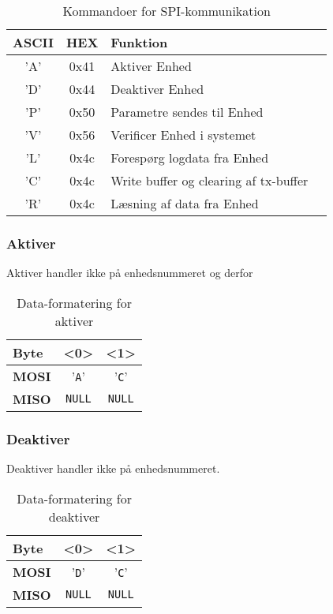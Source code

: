 \begin{table}[H]
\caption{Kommandoer for SPI-kommunikation}
\centering
\begin{tabular}{|c|c|l|c|}
\hline 
\textbf{ASCII} & \textbf{HEX} & \textbf{Funktion} \\ 
\hline 
'A' & 0x41 & Aktiver Enhed \\ 
\hline 
'D' & 0x44 & Deaktiver Enhed \\ 
\hline 
'P' & 0x50 & Parametre sendes til Enhed \\
\hline 
'V' & 0x56 & Verificer Enhed i systemet \\ 
\hline
'L' & 0x4c & Forespørg logdata fra Enhed \\ 
\hline
'C' & 0x4c & Write buffer og clearing af tx-buffer  \\
\hline
'R' & 0x4c & Læsning af data fra Enhed \\
\hline
\end{tabular}
\label{tabel:SWProtokol-kommandoer}
\end{table} 


\subsubsection{Aktiver}

Aktiver handler ikke på enhedsnummeret og derfor 

\begin{table}[H]
	\caption{Data-formatering for aktiver}
	\centering
	\begin{tabular}{|l|c|c|}
		\hline 
		\textbf{Byte} & \textbf{<0>} & \textbf{<1>} \\ 
		\hline 
		\textbf{MOSI} & '\verb+A+' & '\verb+C+'	\\ 
		\hline 
		\textbf{MISO} & \verb+NULL+ & \verb+NULL+ \\ 
		\hline 
	\end{tabular} 
	\label{table:SWProtokol-aktiver}
\end{table}

\subsubsection{Deaktiver}

Deaktiver handler ikke på enhedsnummeret.

\begin{table}[H]
	\caption{Data-formatering for deaktiver}
	\centering
	\begin{tabular}{|l|c|c|}
		\hline 
		\textbf{Byte} & \textbf{<0>} & \textbf{<1>} \\ 
		\hline 
		\textbf{MOSI} & '\verb+D+' & '\verb+C+'\\ 
		\hline 
		\textbf{MISO} & \verb+NULL+ & \verb+NULL+ \\ 
		\hline 
	\end{tabular} 
	\label{table:SWProtokol-deaktiver}
\end{table}

